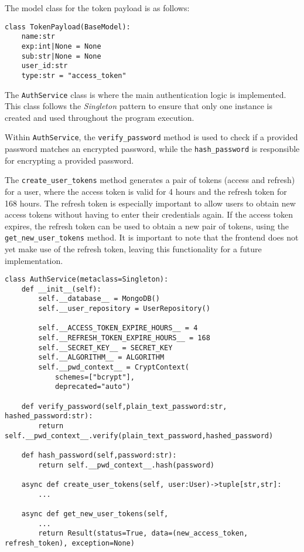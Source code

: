 The model class for the token payload is as follows:
\begin{Verbatim}[fontsize=\small, baselinestretch=0.6]
class TokenPayload(BaseModel):
    name:str
    exp:int|None = None
    sub:str|None = None
    user_id:str
    type:str = "access_token"
\end{Verbatim}

The \texttt{AuthService} class is where the main authentication logic is implemented. This class follows the \textit{Singleton} pattern to ensure that only one instance is created and used throughout the program execution.

Within \texttt{AuthService}, the \texttt{verify\_password} method is used to check if a provided password matches an encrypted password, while the \texttt{hash\_password} is responsible for encrypting a provided password.

The \texttt{create\_user\_tokens} method generates a pair of tokens (access and refresh) for a user, where the access token is valid for 4 hours and the refresh token for 168 hours. The refresh token is especially important to allow users to obtain new access tokens without having to enter their credentials again. If the access token expires, the refresh token can be used to obtain a new pair of tokens, using the \texttt{get\_new\_user\_tokens} method. It is important to note that the frontend does not yet make use of the refresh token, leaving this functionality for a future implementation.

\begin{Verbatim}[fontsize=\small, baselinestretch=0.6]
class AuthService(metaclass=Singleton):
    def __init__(self):
        self.__database__ = MongoDB()
        self.__user_repository = UserRepository()

        self.__ACCESS_TOKEN_EXPIRE_HOURS__ = 4
        self.__REFRESH_TOKEN_EXPIRE_HOURS__ = 168
        self.__SECRET_KEY__ = SECRET_KEY
        self.__ALGORITHM__ = ALGORITHM
        self.__pwd_context__ = CryptContext(
            schemes=["bcrypt"],
            deprecated="auto")

    def verify_password(self,plain_text_password:str, hashed_password:str):
        return self.__pwd_context__.verify(plain_text_password,hashed_password)

    def hash_password(self,password:str):
        return self.__pwd_context__.hash(password)
    
    async def create_user_tokens(self, user:User)->tuple[str,str]:
        ...
        
    async def get_new_user_tokens(self,
        ...
        return Result(status=True, data=(new_access_token, refresh_token), exception=None)
\end{Verbatim}

